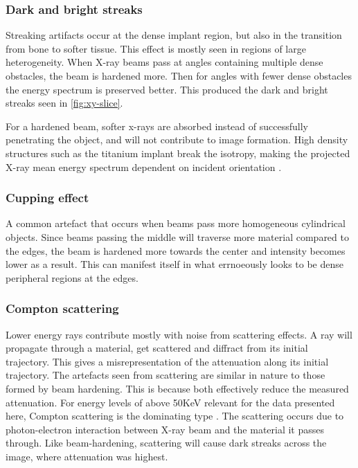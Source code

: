 
\subsubsection{Dark and bright streaks}

Streaking artifacts occur at the dense implant region, but also in the transition from bone to softer
tissue. This effect is mostly seen in regions of large heterogeneity. When X-ray beams pass at angles
containing multiple dense obstacles, the beam is hardened more. Then for angles with fewer dense
obstacles the energy spectrum is preserved better. This produced the dark and bright streaks seen in
\cref{fig:xy-slice}.

For a hardened beam, softer x-rays are absorbed instead of successfully penetrating the object,
and will not contribute to image formation. High density structures such as the titanium implant
break the isotropy, making the projected X-ray mean energy spectrum dependent on incident orientation
\citep{srnoise}.

\subsubsection{Cupping effect}

A common artefact that occurs when beams pass more homogeneous cylindrical objects. Since beams
passing the middle will traverse more material compared to the edges, the beam is hardened more
towards the center and intensity becomes lower as a result. This can manifest itself in what
errnoeously looks to be dense peripheral regions at the edges.

\subsubsection{Compton scattering}

Lower energy rays contribute mostly with noise from scattering effects. A ray will propagate through a
material, get scattered and diffract from its initial trajectory. This gives a misrepresentation of
the attenuation along its initial trajectory. The artefacts seen from scattering are similar in
nature to those formed by beam hardening. This is because both effectively reduce the measured
attenuation. For energy levels of above 50KeV relevant for the data presented here, Compton
scattering is the dominating type \citep{compton}. The scattering occurs due to photon-electron
interaction between X-ray beam and the material it passes through. Like beam-hardening, scattering
will cause dark streaks across the image, where attenuation was highest.

